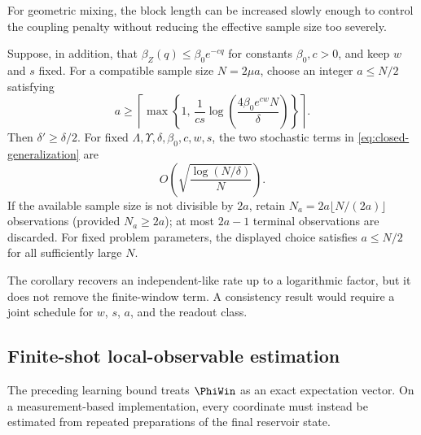 For geometric mixing, the block length can be increased slowly enough to
control the coupling penalty without reducing the effective sample size too
severely.

\begin{corollary}
\label{cor:geometric-mixing}
Suppose, in addition, that
\(\beta_Z(q)\leq\beta_0e^{-cq}\) for constants \(\beta_0,c>0\), and keep
\(w\) and \(s\) fixed. For a compatible sample size \(N=2\mu a\), choose an
integer \(a\leq N/2\) satisfying
\begin{equation}
    a
    \geq
    \left\lceil
      \max\left\{
        1,\,
        \frac1{cs}
        \log\!\left(\frac{4\beta_0e^{cw}N}{\delta}\right)
      \right\}
    \right\rceil.
    \label{eq:geometric-block-choice}
\end{equation}
Then \(\delta'\geq\delta/2\). For fixed
\(\Lambda,\Upsilon,\delta,\beta_0,c,w,s\), the two stochastic terms in
\cref{eq:closed-generalization} are
\[
    O\!\left(\sqrt{\frac{\log(N/\delta)}{N}}\right).
\]
If the available sample size is not divisible by \(2a\), retain
\(N_a=2a\lfloor N/(2a)\rfloor\) observations (provided \(N_a\geq2a\)); at most
\(2a-1\) terminal observations are discarded. For fixed problem parameters,
the displayed choice satisfies \(a\leq N/2\) for all sufficiently large \(N\).
\end{corollary}

The corollary recovers an independent-like rate up to a logarithmic factor, but
it does not remove the finite-window term. A consistency result would require a
joint schedule for \(w\), \(s\), \(a\), and the readout class.

\subsection{Finite-shot local-observable estimation}

The preceding learning bound treats \(\PhiWin\) as an exact expectation vector.
On a measurement-based implementation, every coordinate must instead be
estimated from repeated preparations of the final reservoir state.

